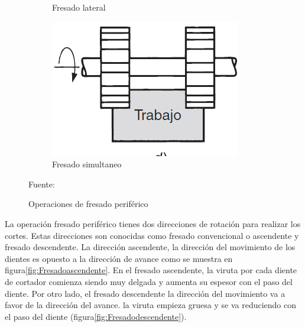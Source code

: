 \begin{figure}[hbt]
\begin{subfigure}{0.4\textwidth}
        \caption{Fresado lateral}
        \label{fig:Fresadolateral}
    \end{subfigure}
    \begin{subfigure}{0.4\textwidth}
        \centering
        \includegraphics[width=0.9\linewidth]{Cap1_FormulaciondelProyecto/Figuras/FresadoSimuntaneo.PNG}
        \caption{Fresado simultaneo}
        \label{fig:Fresadosimultaneo}
    \end{subfigure}
    
    \caption{Operaciones de fresado periférico}{Fuente: \citep{groover2007fundamentals}}
    \label{fig:FresadoPeriferico}
\end{figure}

La operación fresado periférico tienes dos direcciones de rotación para realizar los cortes. Estas direcciones son conocidas como fresado convencional o ascendente y fresado descendente.
La dirección ascendente, la dirección del movimiento de los dientes es opuesto a la dirección de avance como se muestra en figura\ref{fig:Fresadoascendente}. En el fresado ascendente, la viruta por cada diente de cortador comienza siendo muy delgada y aumenta su espesor con el paso del diente. Por otro lado, el fresado descendente la dirección del movimiento va a favor de la dirección del avance. la viruta empieza gruesa y se va reduciendo con el paso del diente \citep{groover2007fundamentals} (figura\ref{fig:Fresadodescendente}).  

